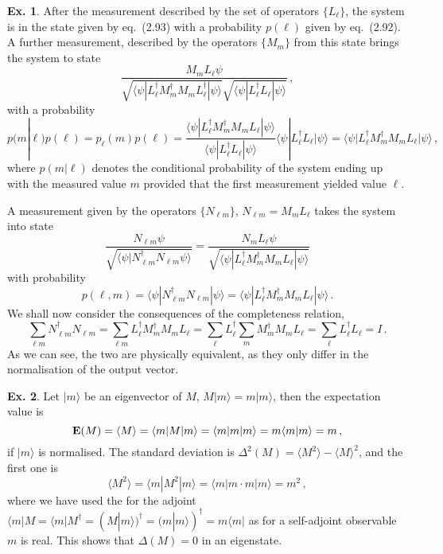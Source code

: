 \documentclass[a4paper,12pt]{article}
\theoremstyle{definition}
\newtheorem{exercise}{Ex.}[section]
\begin{document}
\begin{exercise}
 After the measurement described by the set of operators $\{ L_\ell\}$, the system is in the state given by eq.\ (2.93) with a probability $p(\ell)$ given by eq.\ (2.92). A further measurement, described by the operators $\{ M_m\}$ from this state brings the system to state
 \[
  \frac{M_m L_\ell \psi}{\sqrt{\langle \psi | L_\ell^\dagger M_m^\dagger M_m  L_\ell^\dagger | \psi \rangle} \sqrt{\langle \psi | L_\ell^\dagger L_\ell |\psi\rangle}}\,,
 \]
 with a probability
 \[
  p(m | \ell) p(\ell) = 
  p_\ell(m)p(\ell) = \frac{\langle \psi| L_\ell^\dagger M_m^\dagger M_m L_\ell |\psi\rangle}{\langle \psi | L_\ell^\dagger L_\ell |\psi\rangle} \langle \psi | L_\ell^\dagger L_\ell | \psi\rangle =  \langle \psi| L_\ell^\dagger M_m^\dagger M_m L_\ell |\psi\rangle \,,
 \]
 where $p(m|\ell)$ denotes the conditional probability of the system ending up with the measured value $m$ provided that the first measurement yielded value $\ell$.
 
 A measurement given by the operators $\{ N_{\ell m} \}$, $N_{\ell m} = M_m L_\ell$ takes the system into state
 \[
  \frac{N_{\ell m} \psi}{\sqrt{\langle \psi | N_{\ell m}^\dagger N_{\ell m}\psi\rangle}} = \frac{N_m L_\ell \psi}{\sqrt{\langle \psi | L_\ell^\dagger M_m^\dagger M_m L_\ell | \psi\rangle}}
 \]
 with probability
 \[
  p(\ell, m) = \langle \psi | N_{\ell m}^\dagger N_{\ell m} |\psi\rangle = \langle \psi | L_\ell^\dagger M_m^\dagger M_m L_\ell | \psi\rangle\,.
 \]
 We shall now consider the consequences of the completeness relation,
 \[
  \sum_{\ell m} N_{\ell m}^\dagger N_{\ell m} = \sum_{\ell m} L_\ell^\dagger M_m^\dagger M_m L_\ell = \sum_\ell L_\ell^\dagger \sum_m M_m^\dagger M_m L_\ell = \sum_\ell L_\ell^\dagger L_\ell = I\,.
 \]
 As we can see, the two are physically equivalent, as they only differ in the normalisation of the output vector.
\end{exercise}

\begin{exercise}
 Let $|m\rangle$ be an eigenvector of $M$, $M|m\rangle =m|m\rangle$, then the expectation value is
 \[
  {\bf E}(M) = \langle M \rangle = \langle m | M | m \rangle = \langle m | m | m\rangle = m \langle m | m \rangle = m\,,
 \]
 if $|m\rangle$ is normalised. The standard deviation is $\Delta^2(M) = \langle M^2 \rangle - \langle M \rangle^2$, and the first one is
 \[
  \langle M^2 \rangle = \langle m | M^2 | m \rangle = \langle m | m \cdot m |m\rangle = m^2\,,
 \]
 where we have used the for the adjoint $\langle m | M = \langle m | M^\dagger = (M |m\rangle)^\dagger = (m|m\rangle)^\dagger = m\langle m |$ as for a self-adjoint observable $m$ is real. This shows that $\Delta(M) = 0$ in an eigenstate.
\end{exercise}
\end{document}
